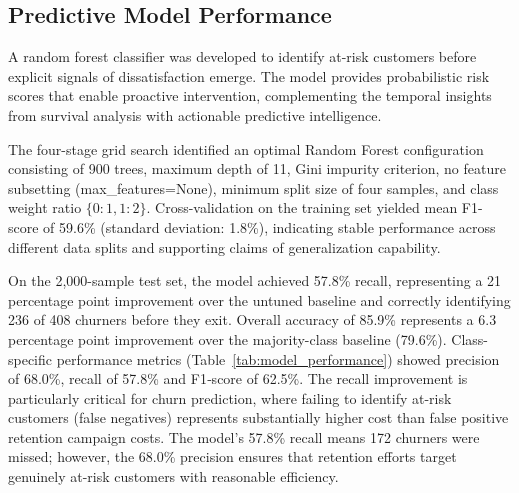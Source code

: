 \documentclass[12pt]{article}
\begin{document}
\subsection{Predictive Model Performance}
A random forest classifier was developed to identify at-risk customers before explicit signals of dissatisfaction emerge. The model provides probabilistic risk scores that enable proactive intervention, complementing the temporal insights from survival analysis with actionable predictive intelligence.

The four-stage grid search identified an optimal Random Forest configuration consisting of 900 trees, maximum depth of 11, Gini impurity criterion, no feature subsetting (max\_features=None), minimum split size of four samples, and class weight ratio \(\{0:1,1:2\}\). Cross-validation on the training set yielded mean F1-score of 59.6\% (standard deviation: 1.8\%), indicating stable performance across different data splits and supporting claims of generalization capability.

On the 2,000-sample test set, the model achieved 57.8\% recall, representing a 21 percentage point improvement over the untuned baseline and correctly identifying 236 of 408 churners before they exit. Overall accuracy of 85.9\% represents a 6.3 percentage point improvement over the majority-class baseline (79.6\%). Class-specific performance metrics (Table~\ref{tab:model_performance}) showed precision of 68.0\%, recall of 57.8\% and F1‑score of 62.5\%. The recall improvement is particularly critical for churn prediction, where failing to identify at-risk customers (false negatives) represents substantially higher cost than false positive retention campaign costs. The model's 57.8\% recall means 172 churners were missed; however, the 68.0\% precision ensures that retention efforts target genuinely at-risk customers with reasonable efficiency.
\end{document}
